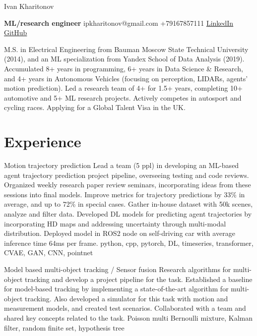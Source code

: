 \documentclass[]{resume}
\begin{document}
\begin{center}
	\Huge Ivan Kharitonov \par
	\normalsize  \textbf{ML/research engineer} \hfill ipkharitonov@gmail.com \hfill +79167857111 \hfill \href{https://www.linkedin.com/in/ivan-kharitonov-main/}{LinkedIn} \hfill \href{https://github.com/kharitonov-ivan}{GitHub}
\end{center}
\vspace{-1em}

\noindent M.S. in Electrical Engineering from Bauman Moscow State Technical University (2014), and an ML specialization from Yandex School of Data Analysis (2019). Accumulated 8+ years in programming, 6+ years in Data Science \& Research, and 4+ years in Autonomous Vehicles (focusing on perception, LIDARs, agents' motion prediction). Led a research team of 4+ for 1.5+ years, completing 10+ automotive and 5+ ML research projects. Actively competes in autosport and cycling races. Applying for a Global Talent Visa in the UK.

\section*{\sectionformat Experience}
\project
{Motion trajectory prediction}
{Lead a team (5 ppl) in developing an ML-based agent trajectory prediction project pipeline, overseeing testing and code reviews. Organized weekly research paper review seminars, incorporating ideas from these sessions into final models.}
{Improve metrics for trajectory predictions by 33\% in average, and up to 72\% in special cases. Gather in-house dataset with 50k scenes, analyze and filter data. Developed DL models for predicting agent trajectories by incorporating HD maps and addressing uncertainty through multi-modal distribution. Deployed model in ROS2 node on self-driving car with average inference time 64ms per frame.}
{python, cpp, pytorch, DL, timeseries, transformer, CVAE, GAN, CNN, pointnet}

\project
{Model based multi-object tracking / Sensor fusion}
{Research algorithms for multi-object tracking and develop a project pipeline for the task.}
{Established a baseline for model-based tracking by implementing a state-of-the-art algorithm for multi-object tracking. Also developed a simulator for this task with motion and measurement models, and created test scenarios. Collaborated with a team and shared key concepts related to the task.}
{Poisson multi Bernoulli mixture, Kalman filter, random finite set, hypothesis tree}
\end{document}
